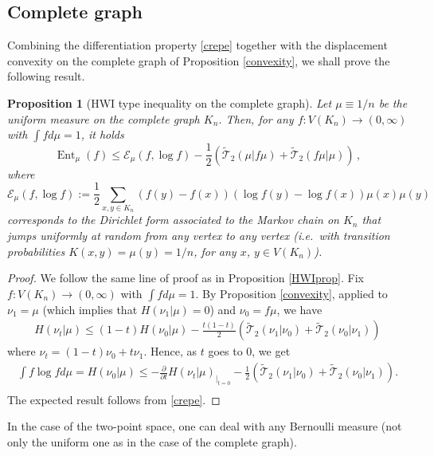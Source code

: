 \documentclass[11pt]{amsart}
\newtheorem{prop}[equation]{Proposition}
\numberwithin{equation}{section}
\begin{document}
\subsection{Complete graph}

Combining the differentiation property \eqref{crepe} together with the displacement convexity on the complete graph of Proposition  
\ref{convexity}, we shall prove the following result.

\begin{prop}[HWI type inequality on the complete graph] \label{hwicomplete}
Let $\mu \equiv 1/n$ be the uni\-form measure on the complete graph $K_n$. Then, for any 
$f \colon V(K_n) \to (0,\infty)$ with $\int fd\mu=1$, it holds
$$
{\operatorname{Ent}}_\mu (f) \leq \mathcal{E}_\mu(f,\log f) - \frac{1}{2} \left( {\widetilde{\mathcal{T}}}_2 (\mu|f \mu) + {\widetilde{\mathcal{T}}}_2 (f \mu|\mu) \right)\,,
$$
where 
$$
\mathcal{E}_\mu(f,\log f) := \frac{1}{2} \sum_{x,y \in K_n} (f(y)-f(x))(\log f(y) - \log f(x))\mu(x)\mu(y) 
$$
corresponds to the Dirichlet form associated to the Markov chain on $K_n$ that jumps uniformly at random from any vertex to any vertex (\textit{i.e.}\ with transition probabilities $K(x,y)=\mu(y)=1/n$, for any $x$, $y \in V(K_n)$). 
\end{prop}

\begin{proof} We follow the same line of proof as in Proposition \ref{HWIprop}.
Fix $f \colon V(K_n) \to (0,\infty)$ with $\int fd\mu=1$.
By Proposition \ref{convexity}, applied to $\nu_1 = \mu$ (which implies that $H(\nu_1|\mu)=0$) and $\nu_0= f\mu$, we have
\begin{align*}
H(\nu_t  | \mu) 
 \leq 
(1-t) H(\nu_0|\mu) - \frac{t(1-t)}{2} \left( {\widetilde{\mathcal{T}}}_2 (\nu_1|\nu_0) + {\widetilde{\mathcal{T}}}_2 (\nu_0|\nu_1) \right) 
\end{align*}
where $\nu_t=(1-t)\nu_0 + t\nu_1$. 
Hence, as $t$ goes to 0, we get 
\begin{eqnarray*}
\int f \log f d\mu=H(\nu_0|\mu) \leq-\frac{\partial}{\partial t} H(\nu_t  | \mu)_{|_{t=0}} 
 - \frac{1}{2} \left( {\widetilde{\mathcal{T}}}_2 (\nu_1|\nu_0) + {\widetilde{\mathcal{T}}}_2 (\nu_0|\nu_1) \right). \\
\end{eqnarray*}
The expected result follows from \eqref{crepe}. 
\end{proof}

In the case of the two-point space, one can deal with any Bernoulli measure (not only the uniform one as in the case of the complete graph).
\end{document}
